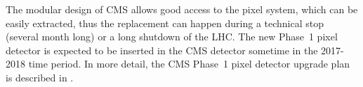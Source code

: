 The modular design of CMS allows good access to the pixel system,
which can be easily extracted, thus the replacement can happen during
a technical stop (several month long) or a long shutdown of the LHC.
The new Phase~1 pixel detector is expected to be inserted in the CMS
detector sometime in the 2017-2018 time period. In more detail, the
CMS Phase~1 pixel detector upgrade plan is described in
\cite{UpgradeProposal}.

